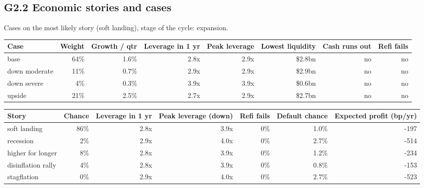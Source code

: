 \documentclass[11pt,a4paper]{article}
\begin{document}
\subsection*{G2.2 Economic stories and cases}
Cases on the most likely story (soft landing), stage of the cycle: expansion.
\begin{center}\scriptsize\setlength{\tabcolsep}{3.5pt}\begin{tabular}{@{}lrrrrrrr@{}}\toprule
Case & Weight & Growth / qtr & Leverage in 1 yr & Peak leverage & Lowest liquidity & Cash runs out & Refi fails \\\midrule
base & 64\% & 1.6\% & 2.8x & 2.9x & \$2.8bn & no & no \\
down moderate & 11\% & 0.7\% & 2.9x & 2.9x & \$2.9bn & no & no \\
down severe & 4\% & 0.3\% & 3.9x & 3.9x & \$0.6bn & no & no \\
upside & 21\% & 2.5\% & 2.7x & 2.9x & \$2.7bn & no & no \\
\bottomrule\end{tabular}\end{center}
\begin{center}\scriptsize\setlength{\tabcolsep}{3.5pt}\begin{tabular}{@{}lrrrrrr@{}}\toprule
Story & Chance & Leverage in 1 yr & Peak leverage (down) & Refi fails & Default chance & Expected profit (bp/yr) \\\midrule
soft landing & 86\% & 2.8x & 3.9x & 0\% & 1.0\% & -197 \\
recession & 2\% & 2.9x & 4.0x & 0\% & 2.7\% & -514 \\
higher for longer & 8\% & 2.8x & 3.9x & 0\% & 1.2\% & -234 \\
disinflation rally & 4\% & 2.8x & 3.9x & 0\% & 0.8\% & -153 \\
stagflation & 0\% & 2.9x & 4.0x & 0\% & 2.7\% & -523 \\
\bottomrule\end{tabular}\end{center}
\end{document}
